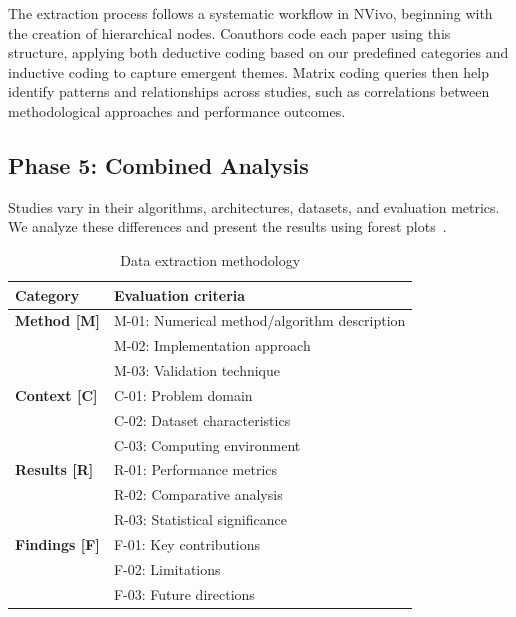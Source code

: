 \documentclass[acmsmall]{acmart}
\begin{document}
The extraction process follows a systematic workflow in NVivo, beginning with the creation of hierarchical nodes. Coauthors code each paper using this structure, applying both deductive coding based on our predefined categories and inductive coding to capture emergent themes. Matrix coding queries then help identify patterns and relationships across studies, such as correlations between methodological approaches and performance outcomes.

\subsection{Phase 5: Combined Analysis}\label{subsec:phase-5-combined-analysis}
Studies vary in their algorithms, architectures, datasets, and evaluation metrics. We analyze these differences and present the results using forest plots~\citet{lalkhen2008statistics}.

\begin{table}[ht]
    \centering
    \caption{Data extraction methodology}
    \label{tab:eval_framework}
    \begin{tabular}{>{\bfseries}ll}
        \toprule
        \textbf{Category} & \textbf{Evaluation criteria}                 \\
        \midrule
        Method [M]        & M-01: Numerical method/algorithm description \\
                          & M-02: Implementation approach                \\
                          & M-03: Validation technique                   \\
        \addlinespace
        Context [C]       & C-01: Problem domain                         \\
                          & C-02: Dataset characteristics                \\
                          & C-03: Computing environment                  \\
        \addlinespace
        Results [R]       & R-01: Performance metrics                    \\
                          & R-02: Comparative analysis                   \\
                          & R-03: Statistical significance               \\
        \addlinespace
        Findings [F]      & F-01: Key contributions                      \\
                          & F-02: Limitations                            \\
                          & F-03: Future directions                      \\
        \bottomrule
    \end{tabular}
\end{table}
\end{document}
